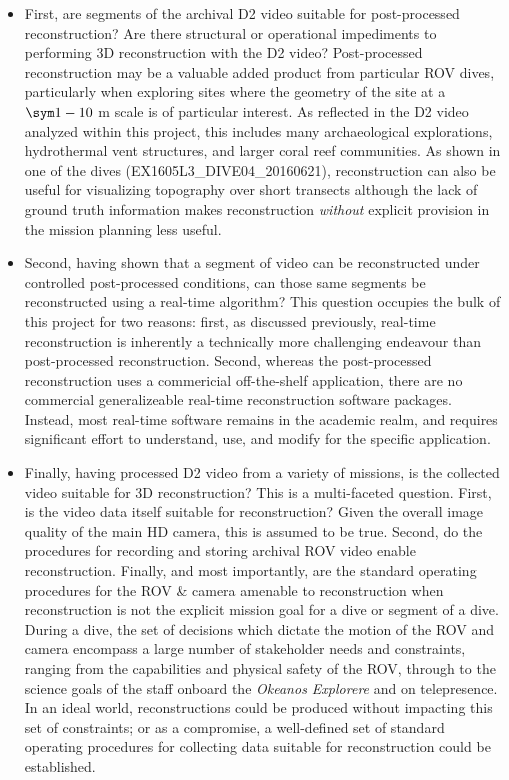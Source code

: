 \documentclass[letterpaper,12pt]{article}
\begin{document}
\begin{itemize}
    \item First, are segments of the archival D2 video suitable for post-processed reconstruction?   Are there structural or operational impediments to performing 3D reconstruction with the D2 video?   Post-processed reconstruction may be a valuable added product from particular ROV dives, particularly when exploring sites where the geometry of the site at a $\sym1-10$ m scale is of particular interest.  As reflected in the D2 video analyzed within this project, this includes many archaeological explorations,  hydrothermal vent structures, and larger coral reef communities.   As shown in one of the dives (EX1605L3\_DIVE04\_20160621), reconstruction can also be useful for visualizing topography over short transects although the lack of ground truth information makes reconstruction \textit{without} explicit provision in the mission planning less useful.
    
    \item Second, having shown that a segment of video can be reconstructed under controlled post-processed conditions, can those same segments be reconstructed using a real-time algorithm?   This question occupies the bulk of this project for two reasons:  first, as discussed previously, real-time reconstruction is inherently a technically more challenging endeavour than post-processed reconstruction.  Second, whereas the post-processed reconstruction uses a commericial off-the-shelf application, there are no commercial generalizeable real-time reconstruction software packages.  Instead, most real-time software remains in the academic realm, and requires significant effort to understand, use, and modify for the specific application.  

    \item Finally, having processed D2 video from a variety of missions, is the collected video suitable for 3D reconstruction?  This is a multi-faceted question.  First, is the video data itself suitable for reconstruction?  Given the overall image quality of the main HD camera, this is assumed to be true.  Second, do the procedures for recording and storing archival ROV video enable reconstruction.   Finally, and most importantly, are the standard operating procedures for the ROV \& camera amenable to reconstruction when reconstruction is not the explicit mission goal for a dive or segment of a dive.  During a dive, the set of decisions which dictate the motion of the ROV and camera encompass a large number of stakeholder needs and constraints, ranging from the capabilities and physical safety of the ROV, through to the science goals of the staff onboard the \textit{Okeanos Explorere} and on telepresence.  In an ideal world, reconstructions could be produced without impacting this set of constraints; or as a compromise, a well-defined set of standard operating procedures for collecting data suitable for reconstruction could be established.  
    
\end{itemize}
\end{document}
